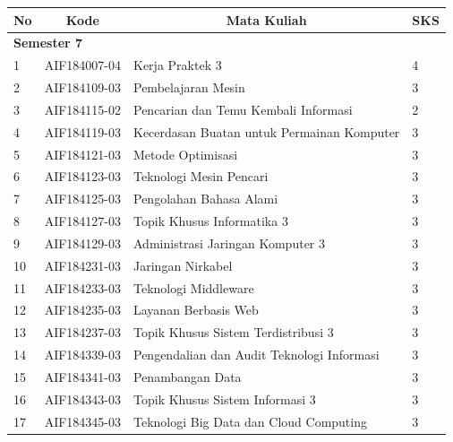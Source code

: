 \documentclass[a4paper,twoside]{article}
\begin{document}
\begin{enumerate}
\begin{enumerate}
\begin{table}[H]
	\centering
		\begin{tabular}{|p{0.5cm}|p{2.85cm}|p{4.95cm}|p{2.7cm}|}
			\hline
			\multicolumn{1}{|c|}{\textbf{No}} & \multicolumn{1}{c|}{\textbf{Kode}} & \multicolumn{1}{c|}{\textbf{Mata Kuliah}} & \multicolumn{1}{c|}{\textbf{SKS}} \\ \hline
			\multicolumn{4}{|l|}{\textbf{Semester 7}}                                \\ \hline
1   & AIF184007-04    & Kerja Praktek 3                            & 4   \\ \hline
2   & AIF184109-03    & Pembelajaran Mesin                         & 3   \\ \hline
3   & AIF184115-02    & Pencarian dan Temu Kembali Informasi       & 2   \\ \hline
4   & AIF184119-03    & Kecerdasan Buatan untuk Permainan Komputer & 3   \\ \hline
5   & AIF184121-03    & Metode Optimisasi                          & 3   \\ \hline
6   & AIF184123-03    & Teknologi Mesin Pencari                    & 3   \\ \hline
7   & AIF184125-03    & Pengolahan Bahasa Alami                    & 3   \\ \hline
8   & AIF184127-03    & Topik Khusus Informatika 3                 & 3   \\ \hline
9   & AIF184129-03    & Administrasi Jaringan Komputer 3           & 3   \\ \hline
			10  & AIF184231-03    & Jaringan Nirkabel                          & 3   \\ \hline
			11  & AIF184233-03    & Teknologi Middleware                       & 3   \\ \hline
			12  & AIF184235-03    & Layanan Berbasis Web                       & 3   \\ \hline
13  & AIF184237-03    & Topik Khusus Sistem Terdistribusi 3        & 3   \\ \hline
14  & AIF184339-03    & Pengendalian dan Audit Teknologi Informasi & 3   \\ \hline
15  & AIF184341-03    & Penambangan Data                           & 3   \\ \hline
16  & AIF184343-03    & Topik Khusus Sistem Informasi 3            & 3   \\ \hline
17  & AIF184345-03  & Teknologi Big Data dan Cloud Computing     & 3   \\ \hline

\end{tabular}
\end{table}
\end{enumerate}
\end{enumerate}
\end{document}
